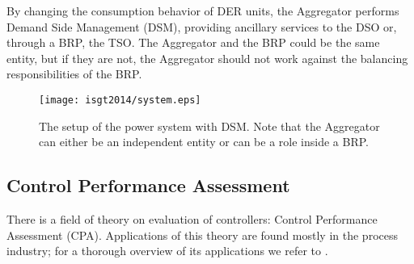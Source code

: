 	By changing the consumption behavior of DER units, the Aggregator performs Demand Side Management (DSM), providing ancillary services to the DSO or, through a BRP, the TSO. The Aggregator and the BRP could be the same entity, but if they are not, the Aggregator should not work against the balancing responsibilities of the BRP.  
	
	\begin{figure}[t]  %
		\centering
		\texttt{[image: isgt2014/system.eps]}
		\caption{The setup of the power system with DSM. Note that the Aggregator can either be an independent entity or can be a role inside a BRP.}\label{fig:systemarch}
	\end{figure}
	
	

	
	\subsection{Control Performance Assessment}
	There is a field of theory on evaluation of controllers: Control Performance Assessment (CPA). Applications of this theory are found mostly in the process industry; for a thorough overview of its applications we refer to \cite{Jelali,Green}. 

